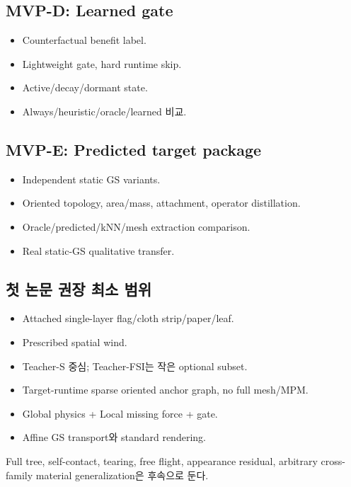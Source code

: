 \documentclass[11pt,a4paper]{article}
\begin{document}
\subsection{MVP-D: Learned gate}

\begin{itemize}[leftmargin=1.5em]
  \item Counterfactual benefit label.
  \item Lightweight gate, hard runtime skip.
  \item Active/decay/dormant state.
  \item Always/heuristic/oracle/learned 비교.
\end{itemize}

\subsection{MVP-E: Predicted target package}

\begin{itemize}[leftmargin=1.5em]
  \item Independent static GS variants.
  \item Oriented topology, area/mass, attachment, operator distillation.
  \item Oracle/predicted/kNN/mesh extraction comparison.
  \item Real static-GS qualitative transfer.
\end{itemize}

\subsection{첫 논문 권장 최소 범위}

\begin{itemize}[leftmargin=1.5em]
  \item Attached single-layer flag/cloth strip/paper/leaf.
  \item Prescribed spatial wind.
  \item Teacher-S 중심; Teacher-FSI는 작은 optional subset.
  \item Target-runtime sparse oriented anchor graph, no full mesh/MPM.
  \item Global physics + Local missing force + gate.
  \item Affine GS transport와 standard rendering.
\end{itemize}

Full tree, self-contact, tearing, free flight, appearance residual,
arbitrary cross-family material generalization은 후속으로 둔다.
\end{document}
